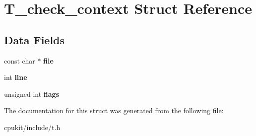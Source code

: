 \hypertarget{structT__check__context}{}\section{T\+\_\+check\+\_\+context Struct Reference}
\label{structT__check__context}
\subsection*{Data Fields}
\begin{DoxyCompactItemize}
\item 
\mbox{\label{structT__check__context_a35be6198685e417a0e6296878251f6ef}} 
const char $\ast$ {\bfseries file}
\item 
\mbox{\label{structT__check__context_a4a0c95ea684cba6065315233c1c0e9c0}} 
int {\bfseries line}
\item 
\mbox{\label{structT__check__context_a8a6ff0a08d34ab66784b9e2ea2731268}} 
unsigned int {\bfseries flags}
\end{DoxyCompactItemize}


The documentation for this struct was generated from the following file\+:\begin{DoxyCompactItemize}
\item 
cpukit/include/t.\+h\end{DoxyCompactItemize}
